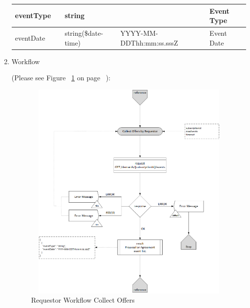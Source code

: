 \begin{enumerate}
\begin{center}
\begin{tabular}{|p{3cm}|l|p{3cm}|p{3cm}|p{4cm}|}
eventType	& 	& 	string	&		&	Event Type \\ 

\hline

eventDate	& 	& 	string(\$date-time)	&	YYYY-MM-DDThh:mm:ss.sssZ	&	Event Date \\ 

\hline

\end{tabular}
\end{center}


\item Workflow

(Please see Figure ~\ref{fig:CO} on page ~\pageref{fig:CO}):

\begin{figure}[htbp]
    \centering
    \includegraphics[width=11cm,height=11cm,angle=0]{./diag/Workflow/Market/CollectOffers-R-Workflow.png}
    \caption{Requestor Workflow Collect Offers }
	\label{fig:CO}
\end{figure}


\end{enumerate}

\newpage


